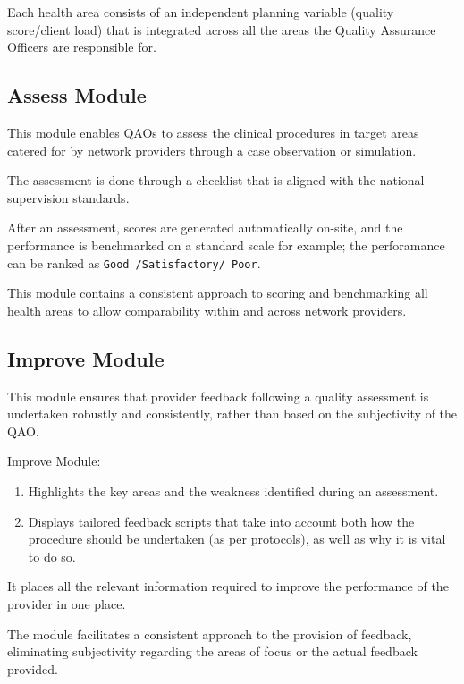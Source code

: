 \documentclass[]{book}
\providecommand{\tightlist}{%
  \setlength{\itemsep}{0pt}\setlength{\parskip}{0pt}}
\begin{document}
Each health area consists of an independent planning variable (quality score/client load) that is integrated across all the areas the Quality Assurance Officers are responsible for.

\hypertarget{assess-module}{%
\subsection{Assess Module}\label{assess-module}}

This module enables QAOs to assess the clinical procedures in target areas catered for by network providers through a case observation or simulation.

The assessment is done through a checklist that is aligned with the national supervision standards.

After an assessment, scores are generated automatically on-site, and the performance is benchmarked on a standard scale for example; the perforamance can be ranked as \texttt{Good\ /Satisfactory/\ Poor}.

This module contains a consistent approach to scoring and benchmarking all health areas to allow comparability within and across network providers.

\hypertarget{improve-module}{%
\subsection{Improve Module}\label{improve-module}}

This module ensures that provider feedback following a quality assessment is undertaken robustly and consistently, rather than based on the subjectivity of the QAO.

Improve Module:

\begin{enumerate}
\def\labelenumi{\arabic{enumi}.}
\tightlist
\item
  Highlights the key areas and the weakness identified during an assessment.
\item
  Displays tailored feedback scripts that take into account both how the procedure should be undertaken (as per protocols), as well as why it is vital to do so.
\end{enumerate}

It places all the relevant information required to improve the performance of the provider in one place.

The module facilitates a consistent approach to the provision of feedback, eliminating subjectivity regarding the areas of focus or the actual feedback provided.
\end{document}
